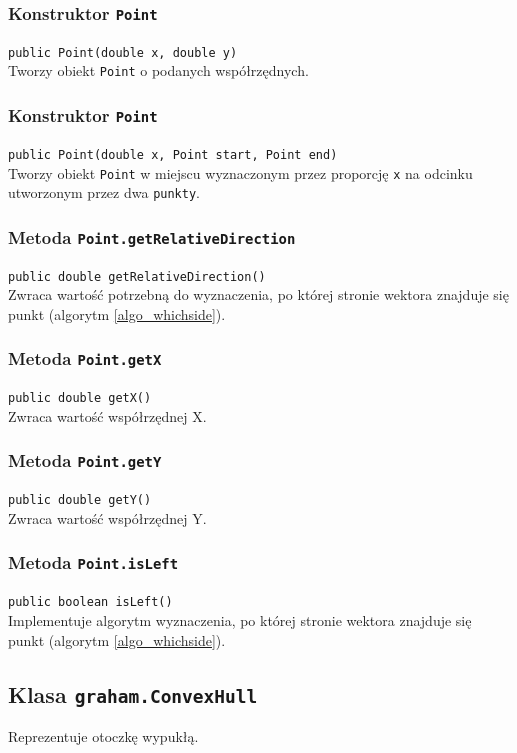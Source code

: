 \documentclass{article}
\begin{document}
\subsubsection{Konstruktor \texttt{Point}}
\texttt{public Point(double x, double y)} \\
Tworzy obiekt \texttt{Point} o podanych współrzędnych.

\subsubsection{Konstruktor \texttt{Point}}
\texttt{public Point(double x, Point start, Point end)} \\
Tworzy obiekt \texttt{Point} w miejscu wyznaczonym przez proporcję \texttt{x} na odcinku utworzonym przez dwa \texttt{punkty}.

\subsubsection{Metoda \texttt{Point.getRelativeDirection}}
\texttt{public double getRelativeDirection()} \\
Zwraca wartość potrzebną do wyznaczenia, po której stronie wektora znajduje się punkt (algorytm \ref{algo_whichside}).

\subsubsection{Metoda \texttt{Point.getX}}
\texttt{public double getX()} \\
Zwraca wartość współrzędnej X.

\subsubsection{Metoda \texttt{Point.getY}}
\texttt{public double getY()} \\
Zwraca wartość współrzędnej Y.

\subsubsection{Metoda \texttt{Point.isLeft}}
\texttt{public boolean isLeft()} \\
Implementuje algorytm wyznaczenia, po której stronie wektora znajduje się punkt (algorytm \ref{algo_whichside}).

\pagebreak
\subsection{Klasa \texttt{graham.ConvexHull}}
Reprezentuje otoczkę wypukłą.
\end{document}
